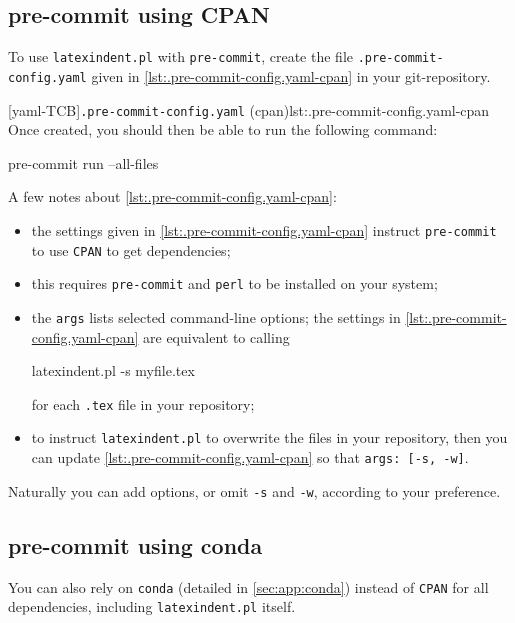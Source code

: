 	\subsection{pre-commit using CPAN}\label{sec:pre-commit-cpan}

		To use \texttt{latexindent.pl} with \texttt{pre-commit}, create the file
		\texttt{.pre-commit-config.yaml} given in \cref{lst:.pre-commit-config.yaml-cpan} in your
		git-repository.   

		[yaml-TCB]{\texttt{.pre-commit-config.yaml} (cpan)}{lst:.pre-commit-config.yaml-cpan}
		Once created, you should then be able to run the following command:
		\begin{commandshell}
pre-commit run --all-files  
\end{commandshell}
		A few notes about \cref{lst:.pre-commit-config.yaml-cpan}:
		\begin{itemize}
			\item the settings given in \cref{lst:.pre-commit-config.yaml-cpan} instruct
			      \texttt{pre-commit} to use \texttt{CPAN} to get dependencies;
			\item this requires \texttt{pre-commit} and \texttt{perl} to be installed on your system;
			\item the \texttt{args} lists selected command-line options; the settings in
			      \cref{lst:.pre-commit-config.yaml-cpan} are equivalent to calling
			      \begin{commandshell}
latexindent.pl -s myfile.tex       
\end{commandshell}
			      for each \texttt{.tex} file in your repository;
			\item to instruct \texttt{latexindent.pl} to overwrite the files in your repository, then you
			      can update \cref{lst:.pre-commit-config.yaml-cpan} so that \texttt{args: [-s, -w]}.
		\end{itemize}

		Naturally you can add options, or omit \texttt{-s} and \texttt{-w}, according to your
		preference.

	\subsection{pre-commit using conda}\label{sec:pre-commit-conda}

		You can also rely on \texttt{conda} (detailed in \cref{sec:app:conda}) instead of
		\texttt{CPAN} for all dependencies, including \texttt{latexindent.pl} itself.
		  

